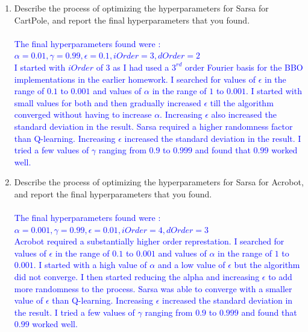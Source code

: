 \documentclass[]{article}
\begin{document}
\begin{enumerate}
    \item Describe the process of optimizing the hyperparameters for Sarsa for CartPole, and report the final hyperparameters that you found.
    \\\\
    \textcolor{blue}{
    	The final hyperparameters found were :\\
    	$
    	\alpha  = 0.01,
    	\gamma = 0.99,
    	\epsilon = 0.1,
    	iOrder = 3,
    	dOrder = 2
    	$\\
    	I started with $iOrder$ of 3 as I had used a $3^{rd}$ order Fourier basis for the BBO implementations in the earlier homework. I searched for values of $\epsilon$ in the range of $0.1$ to $0.001$ and values of $\alpha$ in the range of $1$ to $0.001$.  I started with small values for both and then gradually increased $\epsilon$ till the algorithm converged without having to increase $\alpha$. Increasing $\epsilon$ also increased the standard deviation in the result. Sarsa required a higher randomness factor than Q-learning. Increasing $\epsilon$ increased the standard deviation in the result. I tried a few values of $\gamma$ ranging from $0.9$ to $0.999$ and found that $0.99$ worked well.
    }

    \item Describe the process of optimizing the hyperparameters for Sarsa for Acrobot, and report the final hyperparameters that you found.
    \\\\
    \textcolor{blue}{
    	The final hyperparameters found were :\\
    	$
    	\alpha  = 0.001,
    	\gamma = 0.99,
    	\epsilon = 0.01,
    	iOrder = 4,
    	dOrder = 3
    	$\\
    	Acrobot required a substantially higher order represtation. I searched for values of $\epsilon$ in the range of $0.1$ to $0.001$ and values of $\alpha$ in the range of $1$ to $0.001$. I started with a high value of $\alpha$ and a low value of $\epsilon$ but the algorithm did not converge. I then started reducing the alpha and increasing $\epsilon$ to add more randomness to the process. Sarsa was able to converge with a smaller value of $\epsilon$ than Q-learning. Increasing $\epsilon$ increased the standard deviation in the result. I tried a few values of $\gamma$ ranging from $0.9$ to $0.999$ and found that $0.99$ worked well.
    }


\end{enumerate}
\end{document}

